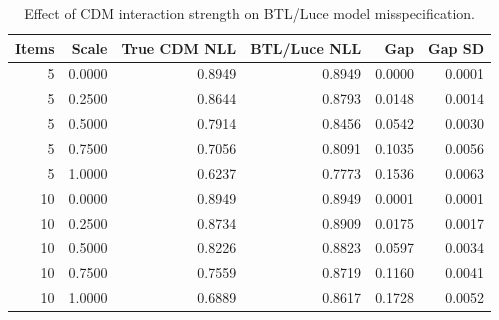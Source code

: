 \begin{table}[htbp]
\caption{Effect of CDM interaction strength on BTL/Luce model misspecification.}
\label{tab:cdm-btl-context-strength}
\begin{tabular}{rrrrrr}
\toprule
Items & Scale & True CDM NLL & BTL/Luce NLL & Gap & Gap SD \\
\midrule
5 & 0.0000 & 0.8949 & 0.8949 & 0.0000 & 0.0001 \\
5 & 0.2500 & 0.8644 & 0.8793 & 0.0148 & 0.0014 \\
5 & 0.5000 & 0.7914 & 0.8456 & 0.0542 & 0.0030 \\
5 & 0.7500 & 0.7056 & 0.8091 & 0.1035 & 0.0056 \\
5 & 1.0000 & 0.6237 & 0.7773 & 0.1536 & 0.0063 \\
10 & 0.0000 & 0.8949 & 0.8949 & 0.0001 & 0.0001 \\
10 & 0.2500 & 0.8734 & 0.8909 & 0.0175 & 0.0017 \\
10 & 0.5000 & 0.8226 & 0.8823 & 0.0597 & 0.0034 \\
10 & 0.7500 & 0.7559 & 0.8719 & 0.1160 & 0.0041 \\
10 & 1.0000 & 0.6889 & 0.8617 & 0.1728 & 0.0052 \\
\bottomrule
\end{tabular}
\end{table}

